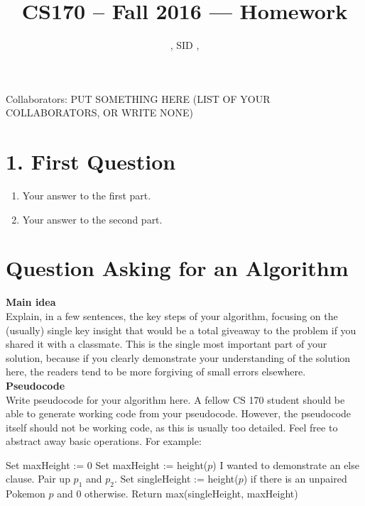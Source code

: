 \documentclass[11pt]{article}
\title{CS170 -- Fall 2016 --- Homework \Homework}
\author{\Name, SID \SID, \texttt{\Login}}
\date{}
\newenvironment{qparts}{\begin{enumerate}[{(}a{)}]}{\end{enumerate}}
\begin{document}
\maketitle

Collaborators: PUT SOMETHING HERE (LIST OF YOUR COLLABORATORS, OR WRITE NONE)

\section*{1. First Question}
\begin{qparts}
\item
Your answer to the first part.

\item
Your answer to the second part.

\end{qparts}



\newpage
\section*{Question Asking for an Algorithm}
\textbf{Main idea}\\

Explain, in a few sentences, the key steps of your algorithm, focusing on the (usually) single key insight that would be a total giveaway to the problem if you shared it with a classmate. This is the single most important part of your solution, because if you clearly demonstrate your understanding of the solution here, the readers tend to be more forgiving of small errors elsewhere.\\

\noindent
\textbf{Pseudocode}\\

Write pseudocode for your algorithm here. A fellow CS 170 student should be able to generate working code from your pseudocode. However, the pseudocode itself should not be working code, as this is usually too detailed. Feel free to abstract away basic operations. For example:\\

\begin{algorithmic}[0]
\State Set maxHeight := $0$
		\State Set maxHeight := height($p$)
	\Else
		\State I wanted to demonstrate an else clause.
	\EndIf
\EndFor
{}
	\State Pair up $p_1$ and $p_2$.
\EndWhile
\State Set singleHeight := height($p$) if there is an unpaired Pokemon $p$ and 0 otherwise.
\State Return max(singleHeight, maxHeight)
\EndProcedure
\end{algorithmic}
\end{document}

